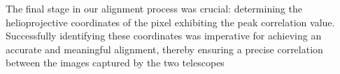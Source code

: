 \documentclass[a4paper,alpha-refs]{eSpectra}
\begin{document}
The final stage in our alignment process was crucial: determining the helioprojective coordinates of the pixel exhibiting the peak correlation value. Successfully identifying these coordinates was imperative for achieving an accurate and meaningful alignment, thereby ensuring a precise correlation between the images captured by the two telescopes



\end{document}
